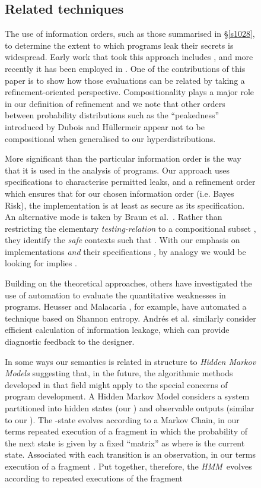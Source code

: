 \documentclass[runningheads]{llncs}
\newcommand\Sec[1] {Sec.~\ref{#1}}
\renewcommand\Sec[1] {\S\ref{#1}}
\newcommand\HMM {\textit{HMM}}
\newcommand\ERef {\mathrel{\preceq}}
\newenvironment{Figure}[2][t]{\begin{figure}[#1]\def\Label{#2}\small}{\label{\Label}\end{figure}}
\begin{document}
\begin{Figure}[ht!]{f1228}
\subsection*{Related techniques}

The use of information orders, such as those summarised in \Sec{s1028}, to determine the extent to which programs leak their secrets is widespread. Early work that took this approach includes  \cite{Millen:87,Wittbold:90,Gray:91}, and more recently it has been employed in \cite{Smith:07,Kopf:07,Braun:08,Clarkson:09,Malacaria:10}.
One of the contributions of this paper is to show how those evaluations can be related by taking a refinement-oriented perspective. Compositionality plays a major role in our definition of refinement and we note that other orders between probability distributions such as  the ``peakedness'' introduced by Dubois and H\"ullermeir  \cite{Dubois:05} appear not to be compositional when generalised to our hyperdistributions.

More significant than the particular information order is the way that it is used in the analysis of programs. Our approach uses specifications to characterise permitted leaks, and a refinement order which ensures that for our chosen information order (i.e. Bayes Risk), the implementation is at least as secure as its specification. An alternative mode is taken by Braun et al.\ \cite{Braun:08}. Rather than restricting  the elementary \emph{testing-relation}  to a compositional subset , they identify the  \emph{safe} contexts  such that \ERef. With our emphasis on implementations  \emph{and} their specifications , by analogy we would be looking for  implies .

Building on the theoretical approaches, others have investigated the use of automation to evaluate the quantitative weaknesses in programs. Heusser and Malacaria \cite{Heusser:10}, for example, have automated a technique based on Shannon entropy. Andr{\'e}s et al. \cite{Andres:10} similarly consider efficient calculation of information leakage, which can provide diagnostic feedback to the designer.

In some ways our semantics is related in structure to \emph{Hidden Markov Models} \cite{Jurafsky:00} suggesting that, in the future, the algorithmic methods developed in that field might apply to the special concerns of program development. A Hidden Markov Model considers a system partitioned into hidden states (our ) and observable outputs (similar to our ). The -state evolves according to a Markov Chain, in our terms repeated execution of a fragment  in which the probability of the next state  is given by a fixed ``matrix''  as  where  is the current state. Associated with each transition is an observation, in our terms execution of a fragment . Put together, therefore, the \HMM\ evolves according to repeated executions of the fragment


\end{Figure}
\end{document}
